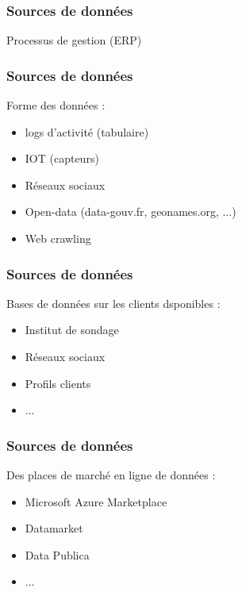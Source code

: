 \documentclass{formation}
\begin{document}
\begin{frame}
  \frametitle{Sources de données}
  Processus de gestion (ERP)
\end{frame}

\begin{frame}
  \frametitle{Sources de données}
  Forme des données :
  \begin{itemize}
  \item logs d'activité (tabulaire)
  \item IOT (capteurs)
  \item Réseaux sociaux
  \item Open-data (data-gouv.fr, geonames.org, ...)
  \item Web crawling 
  \end{itemize}

\end{frame}

\begin{frame}
  \frametitle{Sources de données}
  Bases de données sur les clients dsponibles :
  \begin{itemize}
  \item Institut de sondage
  \item Réseaux sociaux
  \item Profils clients
  \item ...
  \end{itemize}
\end{frame}
    
\begin{frame}
  \frametitle{Sources de données}
  Des places de marché en ligne de données :
  \begin{itemize}
  \item Microsoft Azure Marketplace
  \item Datamarket
  \item Data Publica
  \item ...
  \end{itemize}
\end{frame}
\end{document}
